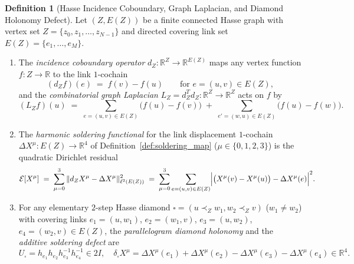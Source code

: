 \documentclass[11pt,a4paper]{article}
\theoremstyle{definition}
\newtheorem{definition}[theorem]{Definition}
\theoremstyle{remark}
\newcommand{\R}{\mathbb{R}}
\begin{document}
\begin{definition}[Hasse Incidence Coboundary, Graph Laplacian, and Diamond Holonomy Defect]
\label{def:hodge_soldering}
Let $(Z, E(Z))$ be a finite connected Hasse graph with vertex set $Z = \{z_0, z_1, \dots, z_{N-1}\}$ and directed covering link set $E(Z) = \{e_1, \dots, e_M\}$.
\begin{enumerate}
    \item The \emph{incidence coboundary operator} $d_Z : \R^Z \to \R^{E(Z)}$ maps any vertex function $f : Z \to \R$ to the link $1$-cochain
    \begin{equation}
    \label{eq:coboundary_def}
    (d_Z f)(e) \;=\; f(v) - f(u) \qquad \text{for } e = (u, v) \in E(Z),
    \end{equation}
    and the \emph{combinatorial graph Laplacian} $L_Z = d_Z^T d_Z : \R^Z \to \R^Z$ acts on $f$ by
    \begin{equation}
    \label{eq:laplacian_def}
    (L_Z f)(u) \;=\; \sum_{e=(u,v)\in E(Z)} \bigl(f(u) - f(v)\bigr) \;+\; \sum_{e'=(w,u)\in E(Z)} \bigl(f(u) - f(w)\bigr).
    \end{equation}
    \item The \emph{harmonic soldering functional} for the link displacement $1$-cochain $\Delta X^\mu : E(Z) \to \R^4$ of Definition~\ref{def:soldering_map} ($\mu \in \{0, 1, 2, 3\}$) is the quadratic Dirichlet residual
    \begin{equation}
    \label{eq:dirichlet_residual}
    \mathcal{E}[X^\mu] \;=\; \sum_{\mu=0}^3 \|d_Z X^\mu - \Delta X^\mu\|_{\ell^2(E(Z))}^2 \;=\; \sum_{\mu=0}^3 \sum_{e=(u,v)\in E(Z)} \Bigl|\bigl(X^\mu(v) - X^\mu(u)\bigr) - \Delta X^\mu(e)\Bigr|^2.
    \end{equation}
    \item For any elementary $2$-step Hasse diamond $\square = (u \prec_Z w_1, w_2 \prec_Z v)$ ($w_1 \neq w_2$) with covering links $e_1 = (u, w_1)$, $e_2 = (w_1, v)$, $e_3 = (u, w_2)$, $e_4 = (w_2, v) \in E(Z)$, the \emph{parallelogram diamond holonomy} and the \emph{additive soldering defect} are
    \begin{equation}
    \label{eq:diamond_defects}
    U_\square = h_{e_1} h_{e_2} h_{e_3}^{-1} h_{e_4}^{-1} \in 2I, \quad
    \delta_\square X^\mu = \Delta X^\mu(e_1) + \Delta X^\mu(e_2) - \Delta X^\mu(e_3) - \Delta X^\mu(e_4) \in \R^4.
    \end{equation}
\end{enumerate}
\end{definition}
\end{document}
